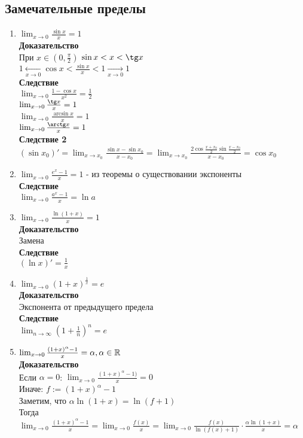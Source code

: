 \documentclass[12pt]{article}
\begin{document}
\subsection{Замечательные пределы}
\begin{enumerate}
    \item $\lim_{x\rightarrow 0} \frac{\sin x}{x} = 1$\\
    \textbf{Доказательство}\\
    При $x \in (0, \frac{\pi}{2})$ $\sin x < x < \tg x$\\
    $1 \xleftarrow[x \rightarrow 0]{} \cos x < \frac{\sin x}{x} < 1 \xrightarrow[x \rightarrow 0]{} 1$\\
    \textbf{Следствие}\\
    $\lim_{x\rightarrow 0} \frac{1-\cos x}{x^2} = \frac12$\\
    $\lim_{x\rightarrow 0} \frac{\tg x}{x} = 1$\\
    $\lim_{x\rightarrow 0} \frac{\arcsin x}{x} = 1$\\
    $\lim_{x\rightarrow 0} \frac{\arctg x}{x} = 1$\\
    \textbf{Следствие 2}\\
    $(\sin x_0)' = \lim_{x\rightarrow x_0} \frac{\sin x - \sin x_0}{x-x_0} = \lim_{x\rightarrow x_0} \frac{2\cos \frac{x+x_0}{2}\sin \frac{x-x_0}{2}}{x-x_0} = \cos x_0$
    \item $\lim_{x\rightarrow 0} \frac{e^x - 1}{x} = 1$ - из теоремы о существовании экспоненты\\
    \textbf{Следствие}\\
    $\lim_{x\rightarrow 0} \frac{a^x-1}{x} = \ln a$
    \item $\lim_{x\rightarrow 0} \frac{\ln (1+x)}{x} = 1$\\
    \textbf{Доказательство}\\
    Замена\\
    \textbf{Следствие}\\
    $(\ln x)' = \frac{1}{x}$
    \item $\lim_{x\rightarrow 0} (1+x)^{\frac{1}{x}} = e$\\
    \textbf{Доказательство}\\
    Экспонента от предыдущего предела\\
    \textbf{Следствие}\\
    $\lim_{n\rightarrow \infty} (1+\frac1n)^n = e$
    \item $\lim_{x\rightarrow 0} \frac{(1+x)^\alpha - 1}{x} = \alpha, \alpha \in \mathbb{R}$\\
    \textbf{Доказательство}\\
    Если $\alpha = 0$: $\lim_{x\rightarrow 0} \frac{(1+x)^\alpha - 1)}{x} = 0$\\
    Иначе: $f:= (1+x)^\alpha - 1$\\
    Заметим, что $\alpha \ln (1+x) = \ln(f+1)$\\
    Тогда $\lim_{x\rightarrow 0} \frac{(1+x)^\alpha - 1}{x} = \lim_{x\rightarrow 0} \frac{f(x)}{x} = \lim_{x\rightarrow 0}\frac{f(x)}{\ln (f(x)+1)} \cdot \frac{\alpha \ln (1+x)}{x} = \alpha$
\end{enumerate}
\end{document}
